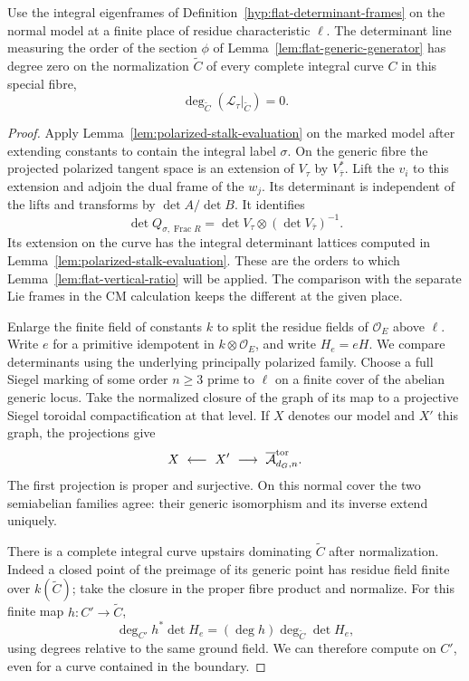 \begin{lemma}\label{lem:flat-special-curve}
Use the integral eigenframes of Definition~\ref{hyp:flat-determinant-frames}
on the normal model at a finite place of residue characteristic \(\ell\).
The determinant line measuring the order of the section \(\phi\)
of Lemma~\ref{lem:flat-generic-generator} has degree zero on the normalization \(\widetilde C\) of every complete integral curve \(C\) in this special fibre,
\[
 \deg_{\widetilde C}(\mathcal L_\tau|_{\widetilde C})=0.
\]

\end{lemma}
\begin{proof}
Apply Lemma~\ref{lem:polarized-stalk-evaluation} on the marked
model after extending constants to contain the integral label
\(\sigma\). On the generic fibre the projected polarized tangent
space is an extension of \(V_\tau\) by \(V_{\bar\tau}^*\).
Lift the \(v_i\) to this extension and adjoin the dual frame of
the \(w_j\). Its determinant is independent of the lifts and
transforms by \(\det A/\det B\). It identifies
\[
       \det Q_{\sigma,\operatorname{Frac}R}
                 =\det V_\tau\otimes(\det V_{\bar\tau})^{-1} .
\]
Its extension on the curve has the integral determinant lattices
computed in Lemma~\ref{lem:polarized-stalk-evaluation}. These
are the orders to which Lemma~\ref{lem:flat-vertical-ratio} will
be applied. The comparison with the separate Lie frames in the CM
calculation keeps the different at the given place.
\label{cor:deep-cover-flat-degree-5}

Enlarge the finite field of constants \(k\) to split the residue
fields of \(\mathcal O_E\) above \(\ell\). Write \(e\) for a primitive
idempotent in \(k\otimes\mathcal O_E\), and write \(H_e=eH\).
We compare determinants using the underlying principally polarized
family. Choose a full Siegel marking of some order \(n\ge3\) prime
to \(\ell\) on a finite cover of the abelian generic locus. Take the
normalized closure of the graph of its map to a projective Siegel
toroidal compactification at that level. If \(X\) denotes our
model and \(X'\) this graph, the projections give
\[
 X\ \longleftarrow\ X'\ \longrightarrow\ \overline{\mathcal A}_{d_G,n}^{\rm tor}.
\]
The first projection is proper and surjective. On this normal cover the two
semiabelian families agree: their generic isomorphism and its inverse
extend uniquely. \cite[I, Proposition~2.7]{faltings-chai}

There is a complete integral curve upstairs dominating
\(\widetilde C\) after normalization. Indeed a closed point of the
preimage of its generic point has residue field finite over
\(k(\widetilde C)\); take the closure in the proper fibre product
and normalize. For this finite map \(h:C'\to\widetilde C\),
\[
              \deg_{C'} h^*\det H_e
                    =(\deg h)\deg_{\widetilde C}\det H_e ,
\]
using degrees relative to the same ground field. We can therefore
compute on \(C'\), even for a curve contained in the boundary.


\end{proof}
